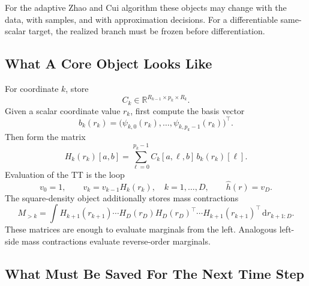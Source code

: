 \documentclass[11pt]{article}
\numberwithin{equation}{section}
\newcommand{\R}{\mathbb R}
\newcommand{\dd}{\,\mathrm d}
\begin{document}
For the adaptive Zhao and Cui \cite{zhao2024ttsequential} algorithm these objects may change with the data,
with samples, and with approximation decisions.  For a differentiable
same-scalar target, the realized branch must be frozen before differentiation.

\subsection{What A Core Object Looks Like}

For coordinate \(k\), store
\[
    C_k\in\R^{R_{k-1}\times p_k\times R_k}.
\]
Given a scalar coordinate value \(r_k\), first compute the basis vector
\[
    b_k(r_k)=
    \bigl(\psi_{k,0}(r_k),\ldots,\psi_{k,p_k-1}(r_k)\bigr)^\top.
\]
Then form the matrix
\begin{equation}
    H_k(r_k)[a,b]
    =
    \sum_{\ell=0}^{p_k-1}C_k[a,\ell,b]\,b_k(r_k)[\ell].
    \label{eq:p24-d1}
\end{equation}
Evaluation of the TT is the loop
\begin{equation}
    v_0=1,\qquad
    v_k=v_{k-1}H_k(r_k),\quad k=1,\ldots,D,
    \qquad
    \widehat h(r)=v_D.
    \label{eq:p24-d2}
\end{equation}
The square-density object additionally stores mass contractions
\begin{equation}
    M_{>k}
    =
    \int H_{k+1}(r_{k+1})\cdots H_D(r_D)
    H_D(r_D)^\top\cdots H_{k+1}(r_{k+1})^\top
    \dd r_{k+1:D}.
    \label{eq:p24-d3}
\end{equation}
These matrices are enough to evaluate marginals from the left.  Analogous
left-side mass contractions evaluate reverse-order marginals.

\subsection{What Must Be Saved For The Next Time Step}
\end{document}
